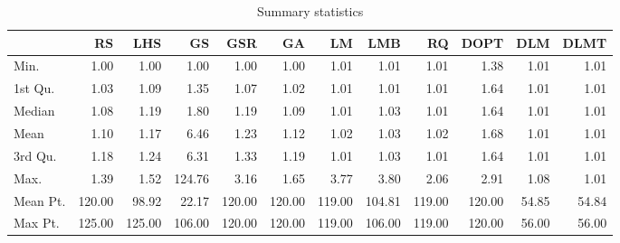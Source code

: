 \documentclass[final,12pt,a4paper]{article}
\begin{document}
\begin{table}[ht]
\centering
\begingroup\small
\begin{tabular}{lrrrrrrrrrrr}
  \hline
 & RS & LHS & GS & GSR & GA & LM & LMB & RQ & DOPT & DLM & DLMT \\ 
  \hline
Min. & 1.00 & 1.00 & 1.00 & 1.00 & 1.00 & 1.01 & 1.01 & 1.01 & 1.38 & 1.01 & 1.01 \\ 
  1st Qu. & 1.03 & 1.09 & 1.35 & 1.07 & 1.02 & 1.01 & 1.01 & 1.01 & 1.64 & 1.01 & 1.01 \\ 
  Median & 1.08 & 1.19 & 1.80 & 1.19 & 1.09 & 1.01 & 1.03 & 1.01 & 1.64 & 1.01 & 1.01 \\ 
  Mean & 1.10 & 1.17 & 6.46 & 1.23 & 1.12 & 1.02 & 1.03 & 1.02 & 1.68 & 1.01 & 1.01 \\ 
  3rd Qu. & 1.18 & 1.24 & 6.31 & 1.33 & 1.19 & 1.01 & 1.03 & 1.01 & 1.64 & 1.01 & 1.01 \\ 
  Max. & 1.39 & 1.52 & 124.76 & 3.16 & 1.65 & 3.77 & 3.80 & 2.06 & 2.91 & 1.08 & 1.01 \\ 
  Mean Pt. & 120.00 & 98.92 & 22.17 & 120.00 & 120.00 & 119.00 & 104.81 & 119.00 & 120.00 & 54.85 & 54.84 \\ 
  Max Pt. & 125.00 & 125.00 & 106.00 & 120.00 & 120.00 & 119.00 & 106.00 & 119.00 & 120.00 & 56.00 & 56.00 \\ 
   \hline
\end{tabular}
\endgroup
\caption{Summary statistics} 
\end{table}
\end{document}
